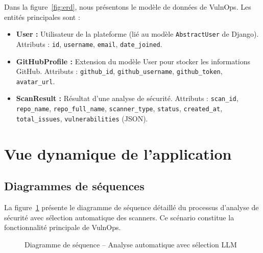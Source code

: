 \documentclass[12pt, a4paper, oneside]{report}
\begin{document}
Dans la figure~\ref{fig:erd}, nous présentons le modèle de données de VulnOps.
Les entités principales sont :

\begin{itemize}
    \item \textbf{User :} Utilisateur de la plateforme (lié au modèle
    \texttt{AbstractUser} de Django). Attributs : \texttt{id}, \texttt{username},
    \texttt{email}, \texttt{date\_joined}.
    
    \item \textbf{GitHubProfile :} Extension du modèle User pour stocker
    les informations GitHub. Attributs : \texttt{github\_id},
    \texttt{github\_username}, \texttt{github\_token}, \texttt{avatar\_url}.
    
    \item \textbf{ScanResult :} Résultat d'une analyse de sécurité. Attributs :
    \texttt{scan\_id}, \texttt{repo\_name}, \texttt{repo\_full\_name},
    \texttt{scanner\_type}, \texttt{status}, \texttt{created\_at},
    \texttt{total\_issues}, \texttt{vulnerabilities} (JSON).
\end{itemize}

\section{Vue dynamique de l'application}

\subsection{Diagrammes de séquences}
\label{subsec:seq}

La figure~\ref{fig:seq_scan} présente le diagramme de séquence détaillé
du processus d'analyse de sécurité avec sélection automatique des scanners.
Ce scénario constitue la fonctionnalité principale de VulnOps.

\begin{figure}[H]
    \centering
    \caption{Diagramme de séquence -- Analyse automatique avec sélection LLM}
    \label{fig:seq_scan}
\end{figure}
\end{document}
